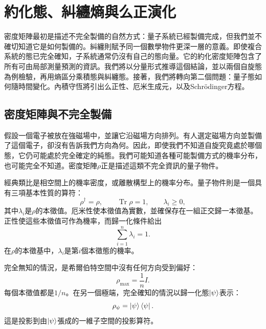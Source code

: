 \chapter{約化態、糾纏熵與么正演化}

密度矩陣最初是描述不完全製備的自然方式：量子系統已經製備完成，但我們並不確切知道它是如何製備的。糾纏則賦予同一個數學物件更深一層的意義。即使複合系統的態已完全確知，子系統通常仍沒有自己的態向量。它的約化密度矩陣包含了所有可由局部測量預測的資訊。我們將以分量形式推導這個結論，並以兩個自旋態為例檢驗，再用熵區分乘積態與糾纏態。接著，我們將轉向第二個問題：量子態如何隨時間變化。內積守恆將引出么正性、厄米生成元，以及Schr\"odinger方程。

\section{密度矩陣與不完全製備}

假設一個電子被放在強磁場中，並讓它沿磁場方向排列。有人選定磁場方向並製備了這個電子，卻沒有告訴我們方向為何。因此，即使我們不知道自旋究竟處於哪個態，它仍可能處於完全確定的純態。我們可能知道各種可能製備方式的機率分布，也可能完全不知道。密度矩陣\(\rho\)正是描述這類不完全資訊的量子物件。

經典類比是相空間上的機率密度，或離散構型上的機率分布。量子物件則是一個具有三項基本性質的算符：
\begin{equation}
\rho^\dagger=\rho,
\qquad
\operatorname{Tr}\rho=1,
\qquad
\lambda_i\geq 0,
\end{equation}
其中\(\lambda_i\)是\(\rho\)的本徵值。厄米性使本徵值為實數，並確保存在一組正交歸一本徵基。正性使這些本徵值可作為機率，而歸一化條件給出
\begin{equation}
\sum_{i=1}^{n}\lambda_i=1.
\end{equation}
在\(\rho\)的本徵基中，\(\lambda_i\)是第\(i\)個本徵態的機率。

完全無知的情況，是希爾伯特空間中沒有任何方向受到偏好：
\begin{equation}
\rho_{\mathrm{max}}=\frac{1}{n}I.
\end{equation}
每個本徵值都是\(1/n\)。在另一個極端，完全確知的情況以歸一化態\(\left\lvert\psi\right\rangle\)表示：
\begin{equation}
\rho_\psi=\left\lvert\psi\right\rangle\left\langle\psi\right\rvert.
\end{equation}
這是投影到由\(\left\lvert\psi\right\rangle\)張成的一維子空間的投影算符。

\begin{classroomqa}
\end{classroomqa}

